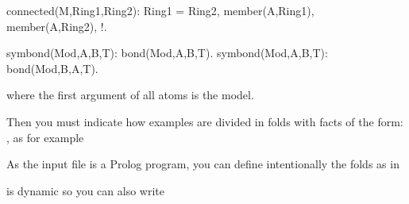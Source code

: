 \documentclass[letterpaper,10pt,english]{sphinxmanual}
\begin{document}
%
\begin{sphinxVerbatim}[commandchars=\\\{\}]
connected(\PYGZus{}M,Ring1,Ring2):\PYGZhy{}
        Ring1 \PYGZbs{}= Ring2,
        member(A,Ring1),
        member(A,Ring2), !.

symbond(Mod,A,B,T):\PYGZhy{} bond(Mod,A,B,T).
symbond(Mod,A,B,T):\PYGZhy{} bond(Mod,B,A,T).
\end{sphinxVerbatim}

where the first argument of all atoms is the model.

Then you must indicate how examples are divided in folds with facts of the form: , as for example

%
\begin{sphinxVerbatim}[commandchars=\\\{\}]
\PYG{p}{[}\PYG{p}{]}
\PYG{p}{[}\PYG{p}{]}
\end{sphinxVerbatim}

As the input file is a Prolog program, you can define intentionally the folds as in

%
\begin{sphinxVerbatim}[commandchars=\\\{\}]
\end{sphinxVerbatim}

 is dynamic so you can also write

%
\begin{sphinxVerbatim}[commandchars=\\\{\}]
 
\end{sphinxVerbatim}
\end{document}
